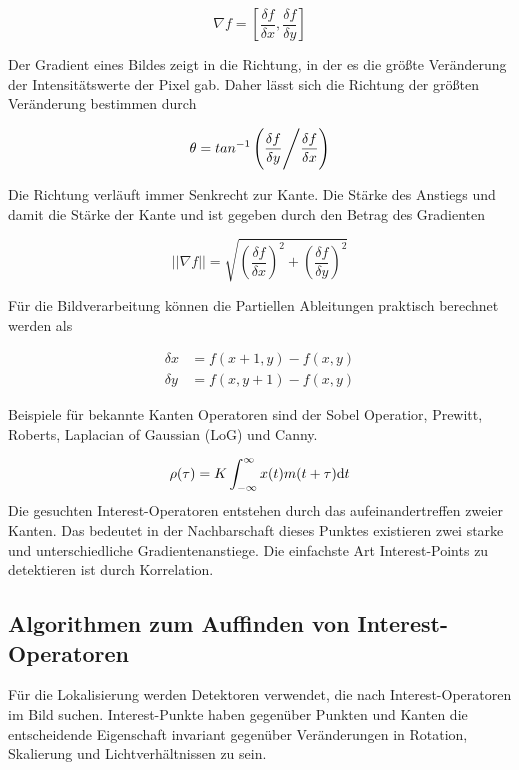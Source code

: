 \begin{equation}
  \nabla f=\left[\dfrac{\delta f}{\delta x}, \dfrac{\delta f}{\delta y}\right]
\end{equation}

Der Gradient eines Bildes zeigt in die Richtung, in der es die grö{\ss}te Veränderung der Intensitätswerte der Pixel gab. Daher lässt sich die Richtung der grö{\ss}ten Veränderung bestimmen durch

\begin{equation}
  \theta=tan^{-1}\left(\dfrac{\delta f}{\delta y}\Bigg{/}\dfrac{\delta f}{\delta x}\right)
\end{equation}

Die Richtung verläuft immer Senkrecht zur Kante. Die Stärke des Anstiegs und damit die Stärke der Kante und ist gegeben durch den Betrag des Gradienten

\begin{equation}
  ||\nabla f|| = \sqrt{\left(\dfrac{\delta f}{\delta x}\right)^2 +
  \left(\dfrac{\delta f}{\delta y}\right)^2}
\end{equation}

Für die Bildverarbeitung können die Partiellen Ableitungen praktisch berechnet werden als 

\begin{equation}
  \begin{split}
  \delta x &= f(x+1,y) -  f(x,y)\\
  \delta y &= f(x,y+1) -  f(x,y)
  \end{split}
\end{equation}

Beispiele für bekannte Kanten Operatoren sind der Sobel Operatior, Prewitt, Roberts, Laplacian of Gaussian (LoG) und Canny.

\begin{equation}
  \rho(\tau)= K\int_{-\infty}^\infty x(t) m(t + \tau) {\rm d}t
\end{equation}
Die gesuchten Interest-Operatoren entstehen durch das aufeinandertreffen zweier Kanten. Das bedeutet in der Nachbarschaft dieses Punktes existieren zwei starke und unterschiedliche Gradientenanstiege. Die einfachste Art Interest-Points zu detektieren ist durch Korrelation.

\subsection{Algorithmen zum Auffinden von Interest-Operatoren}
Für die Lokalisierung werden Detektoren verwendet, die nach Interest-Operatoren im Bild suchen. Interest-Punkte haben gegenüber Punkten und Kanten die entscheidende Eigenschaft invariant gegenüber Veränderungen in Rotation, Skalierung und Lichtverhältnissen zu sein.
 
